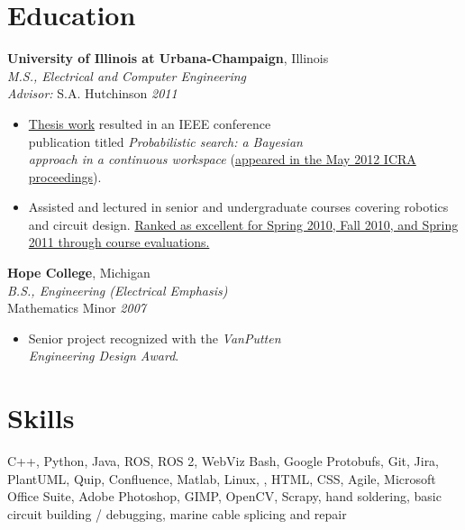 \documentclass[11pt, twoside, a4paper]{article}
\begin{document}
{\begin{multicols}{2}
            \section*{Education}
            \noindent \textbf{University of Illinois at Urbana-Champaign}, Illinois\\
            \textsl{M.S., Electrical and Computer Engineering}\\
            \textsl{Advisor:} S.A. Hutchinson \hfill \textsl{2011}\\\vspace{-10px}
                \begin{itemize}[noitemsep,nolistsep]
            	 \item \href{https://www.ideals.illinois.edu/items/29847}{Thesis work} resulted in an IEEE conference \\publication titled \textsl{Probabilistic search: a Bayesian \\approach in a continuous workspace} (\href{https://ieeexplore.ieee.org/document/6224652}{appeared in the May 2012 ICRA proceedings}).  
                    \item Assisted and lectured in senior and undergraduate courses covering robotics and circuit design. \href{https://citl.illinois.edu/citl-101/measurement-evaluation/teaching-evaluation/teaching-evaluations-(ices)/teachers-ranked-as-excellent}{Ranked as excellent for Spring 2010, Fall 2010, and Spring 2011 through course evaluations.}
                \end{itemize}
                \vspace{10px}
            \noindent \textbf{Hope College}, Michigan\\
            \textsl{B.S., Engineering (Electrical Emphasis)}\\
            Mathematics Minor \hfill \textsl{2007}\\
                \vspace{ -10px}
                \begin{itemize}[noitemsep,nolistsep]
                    \item Senior project recognized with the \textit{VanPutten\\ Engineering Design Award}.
                \end{itemize}
                \vspace{5px}
                \section*{Skills} 
                \noindent
                C++, Python, Java, ROS, ROS 2, WebViz Bash, Google Protobufs, Git, Jira, PlantUML, Quip, Confluence, Matlab, Linux, \LaTeXe, HTML, CSS, Agile, Microsoft Office Suite, Adobe Photoshop, GIMP, OpenCV, Scrapy, hand soldering, basic circuit building / debugging, marine cable splicing and repair
          \newpage
          \vspace*{ 0.5 in }

\end{multicols}}
\end{document}
